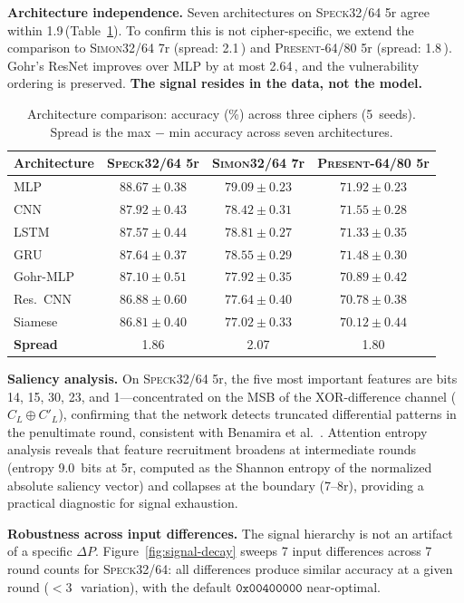 \documentclass[runningheads]{llncs}
\newcommand{\speck}{\textsc{Speck32/64}\xspace}
\newcommand{\simon}{\textsc{Simon32/64}\xspace}
\newcommand{\present}{\textsc{Present-64/80}\xspace}
\newcommand{\pp}{\,\text{pp}}  %
\begin{document}
\textbf{Architecture independence.}
Seven architectures on \speck 5r agree within 1.9\pp (Table~\ref{tab:arch}).
To confirm this is not cipher-specific, we extend the comparison to \simon 7r (spread: 2.1\pp) and \present 5r (spread: 1.8\pp).
Gohr's ResNet improves over MLP by at most 2.64\pp, and the vulnerability ordering is preserved.
\textbf{The signal resides in the data, not the model.}

\begin{table}[t]
\centering
\caption{Architecture comparison: accuracy (\%) across three ciphers (5~seeds). Spread is the max $-$ min accuracy across seven architectures.}\label{tab:arch}
\begin{tabular}{@{}lccc@{}}
\toprule
\textbf{Architecture} & \textbf{\speck 5r} & \textbf{\simon 7r} & \textbf{\present 5r} \\
\midrule
MLP           & $88.67 \pm 0.38$ & $79.09 \pm 0.23$ & $71.92 \pm 0.23$ \\
CNN           & $87.92 \pm 0.43$ & $78.42 \pm 0.31$ & $71.55 \pm 0.28$ \\
LSTM          & $87.57 \pm 0.44$ & $78.81 \pm 0.27$ & $71.33 \pm 0.35$ \\
GRU           & $87.64 \pm 0.37$ & $78.55 \pm 0.29$ & $71.48 \pm 0.30$ \\
Gohr-MLP      & $87.10 \pm 0.51$ & $77.92 \pm 0.35$ & $70.89 \pm 0.42$ \\
Res.~CNN      & $86.88 \pm 0.60$ & $77.64 \pm 0.40$ & $70.78 \pm 0.38$ \\
Siamese       & $86.81 \pm 0.40$ & $77.02 \pm 0.33$ & $70.12 \pm 0.44$ \\
\midrule
\textbf{Spread} & 1.86 & 2.07 & 1.80 \\
\bottomrule
\end{tabular}
\end{table}

\textbf{Saliency analysis.}
On \speck 5r, the five most important features are bits 14, 15, 30, 23, and 1---concentrated on the MSB of the XOR-difference channel ($C_L \oplus C'_L$), confirming that the network detects truncated differential patterns in the penultimate round, consistent with Benamira et al.~\cite{benamira2021deeper}.
Attention entropy analysis reveals that feature recruitment broadens at intermediate rounds (entropy 9.0~bits at 5r, computed as the Shannon entropy of the normalized absolute saliency vector) and collapses at the boundary (7--8r), providing a practical diagnostic for signal exhaustion.

\textbf{Robustness across input differences.}
The signal hierarchy is not an artifact of a specific $\Delta P$.
Figure~\ref{fig:signal-decay} sweeps 7 input differences across 7 round counts for \speck: all differences produce similar accuracy at a given round ($<$3\pp\ variation), with the default $\texttt{0x00400000}$ near-optimal.
\end{document}
